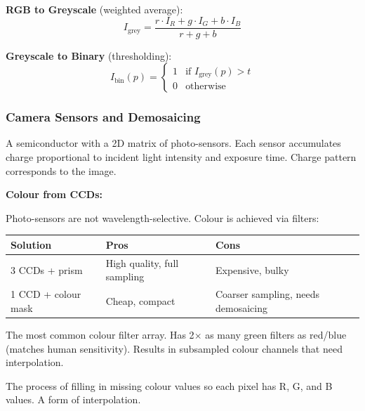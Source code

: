 \textbf{RGB to Greyscale} (weighted average):
\[
I_{\text{grey}} = \frac{r \cdot I_R + g \cdot I_G + b \cdot I_B}{r + g + b}
\]

\textbf{Greyscale to Binary} (thresholding):
\[
I_{\text{bin}}(p) = \begin{cases} 1 & \text{if } I_{\text{grey}}(p) > t \\ 0 & \text{otherwise} \end{cases}
\]

\bigseparator

\subsubsection{Camera Sensors and Demosaicing}

\begin{defbox}
A semiconductor with a 2D matrix of photo-sensors. Each sensor accumulates charge proportional to incident light intensity and exposure time. Charge pattern corresponds to the image.
\end{defbox}

\textbf{Colour from CCDs:}

Photo-sensors are not wavelength-selective. Colour is achieved via filters:

\begin{center}
\renewcommand{\arraystretch}{1.3}
\begin{tabular}{@{} l p{4.5cm} p{4.5cm} @{}}
\toprule
\textbf{Solution} & \textbf{Pros} & \textbf{Cons} \\
\midrule
3 CCDs + prism & High quality, full sampling & Expensive, bulky \\
1 CCD + colour mask & Cheap, compact & Coarser sampling, needs demosaicing \\
\bottomrule
\end{tabular}
\end{center}

\separator

\begin{defbox}
The most common colour filter array. Has 2$\times$ as many green filters as red/blue (matches human sensitivity). Results in subsampled colour channels that need interpolation.
\end{defbox}

\begin{defbox}[Demosaicing]
The process of filling in missing colour values so each pixel has R, G, and B values. A form of interpolation.
\end{defbox}

